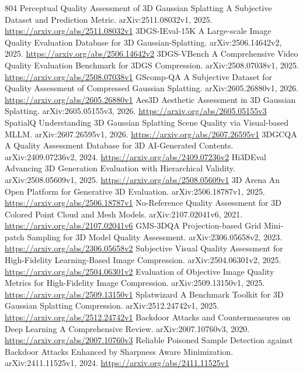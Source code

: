 \documentclass[11pt]{article}
\begin{document}
\begin{thebibliography}{804}
 Perceptual Quality Assessment of 3D Gaussian Splatting A Subjective Dataset and Prediction Metric. arXiv:2511.08032v1, 2025. \url{https://arxiv.org/abs/2511.08032v1}
 3DGS-IEval-15K A Large-scale Image Quality Evaluation Database for 3D Gaussian-Splatting. arXiv:2506.14642v2, 2025. \url{https://arxiv.org/abs/2506.14642v2}
 3DGS-VBench A Comprehensive Video Quality Evaluation Benchmark for 3DGS Compression. arXiv:2508.07038v1, 2025. \url{https://arxiv.org/abs/2508.07038v1}
 GScomp-QA A Subjective Dataset for Quality Assessment of Compressed Gaussian Splatting. arXiv:2605.26880v1, 2026. \url{https://arxiv.org/abs/2605.26880v1}
 Aes3D Aesthetic Assessment in 3D Gaussian Splatting. arXiv:2605.05155v3, 2026. \url{https://arxiv.org/abs/2605.05155v3}
 SpatialQ Understanding 3D Gaussian Splatting Scene Quality via Visual-based MLLM. arXiv:2607.26595v1, 2026. \url{https://arxiv.org/abs/2607.26595v1}
 3DGCQA A Quality Assessment Database for 3D AI-Generated Contents. arXiv:2409.07236v2, 2024. \url{https://arxiv.org/abs/2409.07236v2}
 Hi3DEval Advancing 3D Generation Evaluation with Hierarchical Validity. arXiv:2508.05609v1, 2025. \url{https://arxiv.org/abs/2508.05609v1}
 3D Arena An Open Platform for Generative 3D Evaluation. arXiv:2506.18787v1, 2025. \url{https://arxiv.org/abs/2506.18787v1}
 No-Reference Quality Assessment for 3D Colored Point Cloud and Mesh Models. arXiv:2107.02041v6, 2021. \url{https://arxiv.org/abs/2107.02041v6}
 GMS-3DQA Projection-based Grid Mini-patch Sampling for 3D Model Quality Assessment. arXiv:2306.05658v2, 2023. \url{https://arxiv.org/abs/2306.05658v2}
 Subjective Visual Quality Assessment for High-Fidelity Learning-Based Image Compression. arXiv:2504.06301v2, 2025. \url{https://arxiv.org/abs/2504.06301v2}
 Evaluation of Objective Image Quality Metrics for High-Fidelity Image Compression. arXiv:2509.13150v1, 2025. \url{https://arxiv.org/abs/2509.13150v1}
 Splatwizard A Benchmark Toolkit for 3D Gaussian Splatting Compression. arXiv:2512.24742v1, 2025. \url{https://arxiv.org/abs/2512.24742v1}
 Backdoor Attacks and Countermeasures on Deep Learning A Comprehensive Review. arXiv:2007.10760v3, 2020. \url{https://arxiv.org/abs/2007.10760v3}
 Reliable Poisoned Sample Detection against Backdoor Attacks Enhanced by Sharpness Aware Minimization. arXiv:2411.11525v1, 2024. \url{https://arxiv.org/abs/2411.11525v1}

\end{thebibliography}
\end{document}

